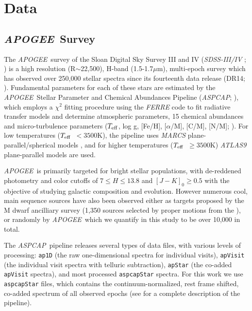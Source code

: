 \documentclass[modern]{aastex62}
\newcommand{\apogee}{\textsl{APOGEE}}
\newcommand{\aspcap}{\textsl{ASPCAP}}
\newcommand{\teff}{$T_{\rm eff}$}
\begin{document}
\section{Data} \label{sec:data}

\subsection{\apogee\ Survey}

The \apogee\ survey \citep{Majewski:2015} of the Sloan Digital Sky Survey III and IV (\textsl{SDSS-III/IV} \citealt{Eisenstein:2011}; \citealt{Blanton:2017}) is a high resolution (R$\sim$22,500), H-band (1.5-1.7$\mu$m), multi-epoch survey which has observed over 250,000 stellar spectra since its fourteenth data release (DR14; \citealt{Abolfathi:2017}). Fundamental parameters for each of these stars are estimated by the \apogee\ Stellar Parameter and Chemical Abundances Pipeline (\aspcap; \citealt{Perez:2016}), which employs a $\chi^2$ fitting procedure using the \textsl{FERRE} code to fit radiative transfer models and determine atmospheric parameters, 15 chemical abundances and micro-turbulence parameters (\teff, log g, [Fe/H], [$\alpha$/M], [C/M], [N/M]; \citealt{Meszaros:2012}). For low temperatures (\teff\ $<3500$K), the pipeline uses \textsl{MARCS} plane-parallel/spherical models \citep{Gustafsson:2008}, and for higher temperatures (\teff\ $\geq3500$K) \textsl{ATLAS9} \citep{Castelli:2004} plane-parallel models are used.

\apogee\ is primarily targeted for bright stellar populations, with de-reddened photometry and color cutoffs of $7 \leq H \leq 13.8$ and $[J-K]_0 \geq 0.5$ \citep{Zasowski:2013} with the objective of studying galactic composition and evolution. However numerous cool, main sequence sources have also been observed either as targets proposed by the M dwarf ancilliary survey (1,350 sources selected by proper motions from the  \citealt{Desphande:2013}), or randomly by \apogee\, which we quantify in this study to be over 10,000 in total.

The \aspcap\ pipeline releases several types of data files, with various levels of processing: {\tt\string ap1D} (the raw one-dimensional spectra for individual visits), {\tt\string apVisit} (the individual visit spectra with telluric subtraction), {\tt\string apStar} (the co-added {\tt\string apVisit} spectra), and most processed {\tt\string aspcapStar} spectra. For this work we use {\tt\string aspcapStar} files, which contains the continuum-normalized, rest frame shifted, co-added spectrum of all observed epochs (see \citealt{Perez:2016} for a complete description of the pipeline). \color{gcolor}{HOGG: do you want to comment on continuum normalization issues?}\color{black}
 
\end{document}
